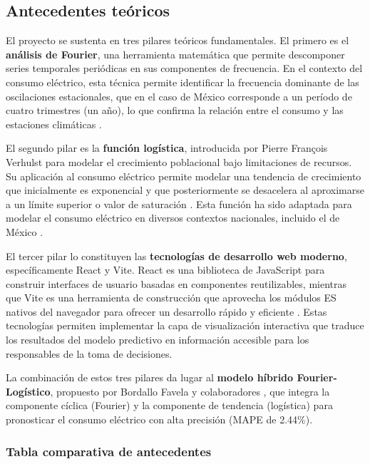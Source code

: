 \subsection{Antecedentes teóricos} \label{sec:antecedentes_teoricos} %

El proyecto se sustenta en tres pilares teóricos fundamentales. El primero es el \textbf{análisis de Fourier}, una herramienta matemática que permite descomponer series temporales periódicas en sus componentes de frecuencia. En el contexto del consumo eléctrico, esta técnica permite identificar la frecuencia dominante de las oscilaciones estacionales, que en el caso de México corresponde a un período de cuatro trimestres (un año), lo que confirma la relación entre el consumo y las estaciones climáticas \cite{bordallo2025}.

El segundo pilar es la \textbf{función logística}, introducida por Pierre François Verhulst para modelar el crecimiento poblacional bajo limitaciones de recursos. Su aplicación al consumo eléctrico permite modelar una tendencia de crecimiento que inicialmente es exponencial y que posteriormente se desacelera al aproximarse a un límite superior o valor de saturación \cite{duan2023}. Esta función ha sido adaptada para modelar el consumo eléctrico en diversos contextos nacionales, incluido el de México \cite{bordallo2025}.

El tercer pilar lo constituyen las \textbf{tecnologías de desarrollo web moderno}, específicamente React y Vite. React es una biblioteca de JavaScript para construir interfaces de usuario basadas en componentes reutilizables, mientras que Vite es una herramienta de construcción que aprovecha los módulos ES nativos del navegador para ofrecer un desarrollo rápido y eficiente \cite{react2024, vite2024}. Estas tecnologías permiten implementar la capa de visualización interactiva que traduce los resultados del modelo predictivo en información accesible para los responsables de la toma de decisiones.

La combinación de estos tres pilares da lugar al \textbf{modelo híbrido Fourier-Logístico}, propuesto por Bordallo Favela y colaboradores \cite{bordallo2025}, que integra la componente cíclica (Fourier) y la componente de tendencia (logística) para pronosticar el consumo eléctrico con alta precisión (MAPE de 2.44\%).

\subsubsection{Tabla comparativa de antecedentes} \label{subsec:tabla_comparativa_antecedentes} %

